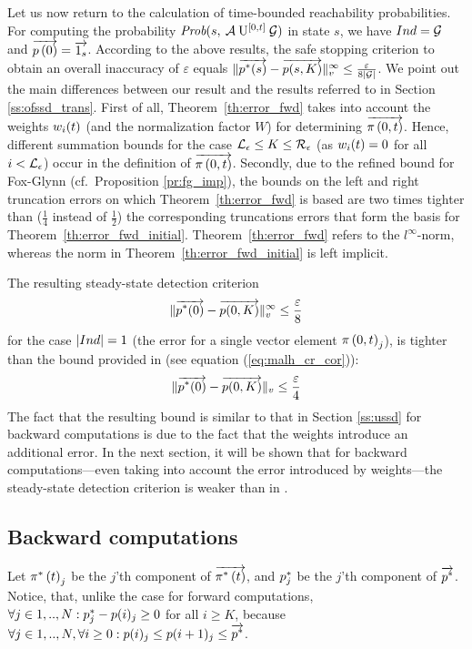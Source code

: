 \documentclass{entcs}
\newcommand{\SubSection}[1]{\subsection{#1}}
\begin{document}
		Let us now return to the calculation of time-bounded reachability probabilities. For computing the probability $\mbox{\it Prob}(s, \: \mathcal{A} \: \mathrm{U}^{[0,t]} \: \mathcal{G} )$ in state $s$, we have $Ind = \mathcal{G}$ and $\overrightarrow{p \left( 0 \right)} = \overrightarrow{1_{s} }$.  According to the above results, the safe stopping criterion to obtain an overall inaccuracy of $\varepsilon$ equals  $\lVert  \overrightarrow{p^{*}(s)} - \overrightarrow{p(s,K)}  \rVert_{v}^{\infty} \leq \frac{\varepsilon}{8 | \mathcal{G} |}$. We point out the main differences between our result and the results referred to in Section \ref{ss:ofssd_trans}.
		First of all, Theorem~\ref{th:error_fwd} takes into account the weights $w_{i}(t)$ (and the normalization factor $W$) for determining $\overrightarrow{\pi \left(0, t \right )}$.  Hence, different summation bounds for the case $\mathcal{L}_{\epsilon} \leq K \leq \mathcal{R}_{\epsilon}$ (as $w_{i}(t) = 0$ for all $i < \mathcal{L}_{\epsilon}$) occur in the definition of $\overrightarrow{\pi \left(0, t \right )}$.  Secondly, due to the refined bound for Fox-Glynn (cf.\ Proposition \ref{pr:fg_imp}), the bounds on the left and right truncation errors on which Theorem~\ref{th:error_fwd} is based are two times tighter than ($\frac{1}{4}$ instead of $\frac{1}{2}$) the corresponding truncations errors that form the basis for Theorem~\ref{th:error_fwd_initial}.  Theorem~\ref{th:error_fwd} refers to the $l^{\infty}$-norm, whereas the norm in Theorem~\ref{th:error_fwd_initial} is left implicit.

		The resulting steady-state detection criterion
			\[
				\lVert  \overrightarrow{p^{*}(0)} - \overrightarrow{p(0,K)}  \rVert_{v}^{\infty} \leq \frac{\varepsilon}{8}
			\]
		for the case $|Ind| = 1$ (the error for a single vector element $\pi \left(0, t \right )_{j}$), is tighter than the bound provided in \cite{MalhotraMT_MR94} (see equation (\ref{eq:malh_cr_cor})):
			\[
				\lVert \overrightarrow{p^{*}(0)} - \overrightarrow{p(0,K)} \rVert_{v} \leq \frac{\varepsilon}{4}
			\]
		The fact that the resulting bound is similar to that in Section \ref{ss:ussd} for backward computations is due to the fact that the weights introduce an additional error. In the next section, it will be shown that for backward computations---even taking into account the error introduced by weights---the steady-state detection criterion is weaker than in \cite{YounesKNP_TACAS04,YounesKNP_STTT05}.

	\SubSection{Backward computations \label{ss:error_backward}}
		
		Let $\pi^{*} \left( t \right)_{j}$ be the $j$'th component of $\overrightarrow{\pi^{*} \left( t \right)}$, and $p^{*}_{j}$ be the $j$'th component of $\overrightarrow{p^{*}}$.  Notice, that, unlike the case for forward computations, $\forall j \in 1,..,N : p^{*}_{j} - p(i)_{j} \geq 0$ for all $i \geq K$, because $\forall j \in 1,..,N, \forall i\geq0 : p(i)_{j} \leq p(i+1)_{j} \leq \overrightarrow{p^{*}}$.
		
\end{document}
